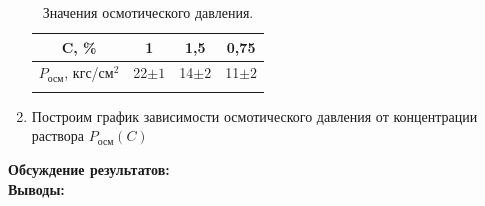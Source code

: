 \documentclass[a4paper, 12pt]{article}%
\begin{document}
\begin{enumerate}
	
	\begin{longtable}{|c|c|c|c|}
		\hline
	C, \%	&  1  &  1,5 &  0,75 \\ \hline
	$P_{\text{осм}}$, кгс/см$^2$ & 22$\pm 1$ & 14$\pm 2$& 11$\pm 2$ \\ \hline
	\caption{Значения осмотического давления.}
	\end{longtable}



\item Построим график зависимости осмотического давления от концентрации раствора 	$P_{\text{осм}}(C)$

\begin{figure}[H]
\end{figure}




\end{enumerate}

	\textbf{Обсуждение результатов: }\\
		
		
	\textbf{Выводы: }\\
	
\end{document}
